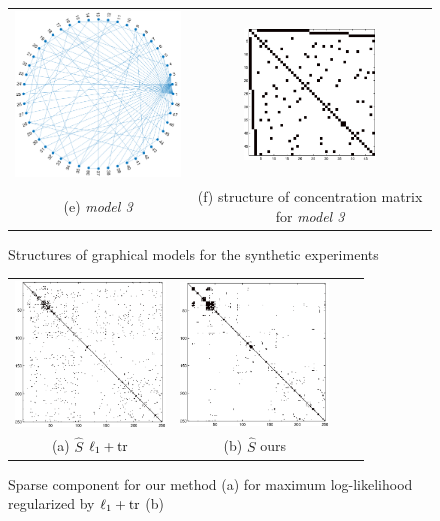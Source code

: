 \documentclass{article}
\begin{document}
\begin{figure}
\begin{tabular}{cc}
      \includegraphics[width=6cm]{fig/diff_graph} 
  &   \includegraphics[width=3.5cm]{fig/diff_true}
   \\    (e) \textit{model 3} & (f)  structure of concentration matrix for \textit{model 3}
\end{tabular}
\caption{ Structures of graphical models for the synthetic experiments}
\end{figure}

\begin{figure}
\center
\begin{tabular}{cccc}
      \includegraphics[width=4cm]{fig/MILE_Som}
  &   \includegraphics[height=3.8cm]{fig/MILE_Ssl_ordered}
   \\   (a)  $\hat{S}$ $\ell_1+{\rm tr}$  & (b) $\hat{S}$ ours 
\end{tabular}
\caption{Sparse component for our method (a) for maximum log-likelihood regularized by $\ell_1+{\rm tr}$ (b) }
\end{figure}
\end{document}
